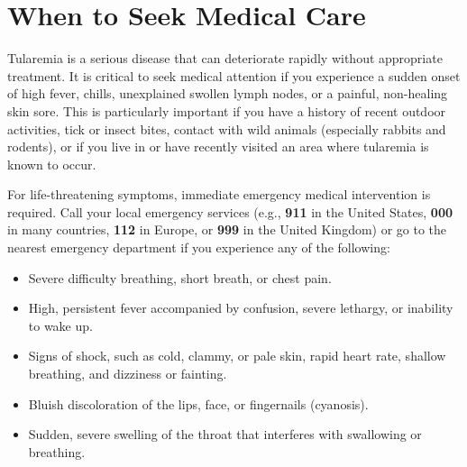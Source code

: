 \section*{When to Seek Medical Care}
Tularemia is a serious disease that can deteriorate rapidly without appropriate treatment. It is critical to seek medical attention if you experience a sudden onset of high fever, chills, unexplained swollen lymph nodes, or a painful, non-healing skin sore. This is particularly important if you have a history of recent outdoor activities, tick or insect bites, contact with wild animals (especially rabbits and rodents), or if you live in or have recently visited an area where tularemia is known to occur.

For life-threatening symptoms, immediate emergency medical intervention is required. Call your local emergency services (e.g., \textbf{911} in the United States, \textbf{000} in many countries, \textbf{112} in Europe, or \textbf{999} in the United Kingdom) or go to the nearest emergency department if you experience any of the following:
\begin{itemize}
    \item Severe difficulty breathing, short breath, or chest pain.
    \item High, persistent fever accompanied by confusion, severe lethargy, or inability to wake up.
    \item Signs of shock, such as cold, clammy, or pale skin, rapid heart rate, shallow breathing, and dizziness or fainting.
    \item Bluish discoloration of the lips, face, or fingernails (cyanosis).
    \item Sudden, severe swelling of the throat that interferes with swallowing or breathing.
\end{itemize}

